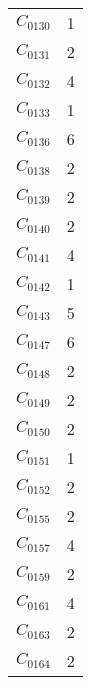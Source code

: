 \documentclass[a4paper,10pt]{article}
\begin{document}
\begin{center}
\begin{longtable}{cc}
$C_{0130}$ & 1 \\
$C_{0131}$ & 2 \\
$C_{0132}$ & 4 \\
$C_{0133}$ & 1 \\
$C_{0136}$ & 6 \\
$C_{0138}$ & 2 \\
$C_{0139}$ & 2 \\
$C_{0140}$ & 2 \\
$C_{0141}$ & 4 \\
$C_{0142}$ & 1 \\
$C_{0143}$ & 5 \\
$C_{0147}$ & 6 \\
$C_{0148}$ & 2 \\
$C_{0149}$ & 2 \\
$C_{0150}$ & 2 \\
$C_{0151}$ & 1 \\
$C_{0152}$ & 2 \\
$C_{0155}$ & 2 \\
$C_{0157}$ & 4 \\
$C_{0159}$ & 2 \\
$C_{0161}$ & 4 \\
$C_{0163}$ & 2 \\
$C_{0164}$ & 2 \\
\end{longtable}
\end{center}
\end{document}
